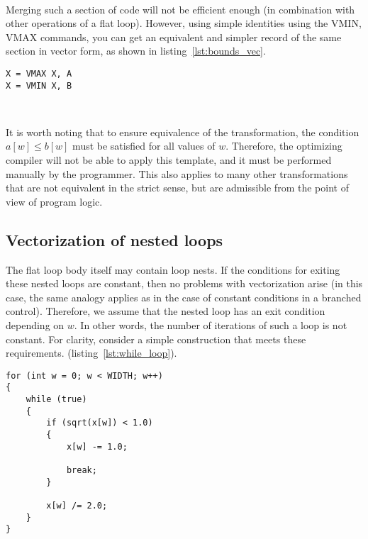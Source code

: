 \documentclass[
11pt,%
tightenlines,%
twoside,%
onecolumn,%
nofloats,%
nobibnotes,%
nofootinbib,%
superscriptaddress,%
noshowpacs,%
centertags]%
{revtex4}
\begin{document}
\

Merging such a section of code will not be efficient enough (in combination with other operations of a flat loop).
However, using simple identities using the VMIN, VMAX commands, you can get an equivalent and simpler record of the same section in vector form, as shown in listing~\ref{lst:bounds_vec}.

\begin{lstlisting}[caption={Vectorized form of limiting a value using the lower and upper bounds.},label={lst:bounds_vec}]
X = VMAX X, A
X = VMIN X, B
\end{lstlisting}

\

It is worth noting that to ensure equivalence of the transformation, the condition $a[w] \le b[w]$ must be satisfied for all values of $w$.
Therefore, the optimizing compiler will not be able to apply this template, and it must be performed manually by the programmer.
This also applies to many other transformations that are not equivalent in the strict sense, but are admissible from the point of view of program logic.

\subsection{Vectorization of nested loops}

The flat loop body itself may contain loop nests.
If the conditions for exiting these nested loops are constant, then no problems with vectorization arise (in this case, the same analogy applies as in the case of constant conditions in a branched control).
Therefore, we assume that the nested loop has an exit condition depending on $w$.
In other words, the number of iterations of such a loop is not constant.
For clarity, consider a simple construction that meets these requirements. (listing~\ref{lst:while_loop}).

\begin{lstlisting}[caption={Flat loop containing a loop with a non-constant number of iterations},label={lst:while_loop}]
for (int w = 0; w < WIDTH; w++)
{
    while (true)
    {
        if (sqrt(x[w]) < 1.0)
        {
            x[w] -= 1.0;

            break;
        }
            
        x[w] /= 2.0;
    }
}
\end{lstlisting}

\
\end{document}

